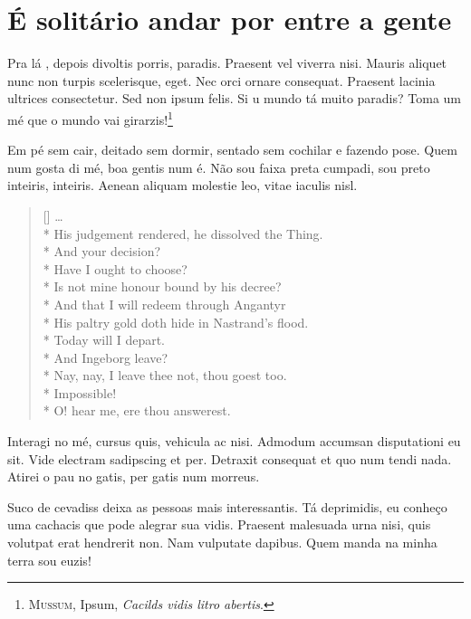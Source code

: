 \section{É solitário andar por entre a gente}


Pra lá , depois divoltis porris, paradis. Praesent vel viverra nisi. Mauris
aliquet nunc non turpis scelerisque, eget. Nec orci ornare consequat. Praesent
lacinia ultrices consectetur. Sed non ipsum felis. Si u mundo tá muito paradis?
Toma um mé que o mundo vai girarzis!\footnote{\textsc{Mussum}, Ipsum,
\textit{Cacilds vidis litro abertis}.}


Em pé sem cair, deitado sem dormir, sentado sem cochilar e fazendo pose. Quem
num gosta di mé, boa gentis num é. Não sou faixa preta cumpadi, sou preto
inteiris, inteiris. Aenean aliquam molestie leo, vitae iaculis nisl.

\settowidth{\versewidth}{Nay, nay, I leave thee not, thou goest too}
\begin{verse}[\versewidth]
\ldots \\*
His judgement rendered, he dissolved the Thing. \\*
 And your decision? \\*
 
Have I ought to choose? \\*
Is not mine honour bound by his decree? \\*
And that I will redeem through Angantyr \\*
His paltry gold doth hide in Nastrand’s flood. \\*
Today will I depart. \\*
 
And Ingeborg leave? \\*
 Nay, nay, I leave thee not,
thou goest too. \\*
 Impossible! \\*
 
O! hear me, ere thou answerest.
\end{verse}

Interagi no mé, cursus quis, vehicula ac nisi. Admodum accumsan disputationi eu
sit. Vide electram sadipscing et per. Detraxit consequat et quo num tendi nada.
Atirei o pau no gatis, per gatis num morreus.

Suco de cevadiss deixa as pessoas mais interessantis. Tá deprimidis, eu conheço
uma cachacis que pode alegrar sua vidis. Praesent malesuada urna nisi, quis
volutpat erat hendrerit non. Nam vulputate dapibus. Quem manda na minha terra
sou euzis!


